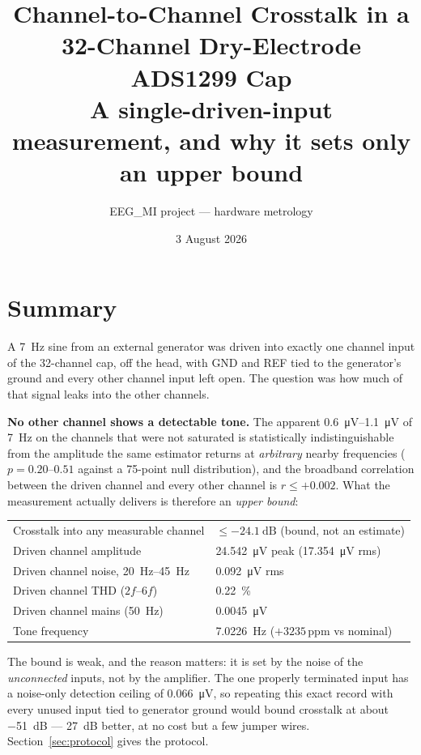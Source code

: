 \documentclass[11pt,a4paper]{article}
\title{\textbf{Channel-to-Channel Crosstalk in a 32-Channel Dry-Electrode\\ADS1299 Cap}\\[4pt]
\large A single-driven-input measurement, and why it sets only an upper bound}
\author{EEG\_MI project --- hardware metrology}
\date{3 August 2026}
\begin{document}
\maketitle

\section*{Summary}

A \SI{7}{\hertz} sine from an external generator was driven into exactly one channel input of
the 32-channel cap, off the head, with GND and REF tied to the generator's ground and every
other channel input left open. The question was how much of that signal leaks into the other
channels.

\textbf{No other channel shows a detectable tone.} The apparent \SIrange{0.6}{1.1}{\micro\volt}
of \SI{7}{\hertz} on the channels that were not saturated is statistically indistinguishable
from the amplitude the same estimator returns at \emph{arbitrary} nearby frequencies
($p=0.20$--$0.51$ against a 75-point null distribution), and the broadband correlation between
the driven channel and every other channel is $r \le +0.002$. What the measurement actually
delivers is therefore an \emph{upper bound}:

\begin{center}
\begin{tabular}{ll}
\toprule
Crosstalk into any measurable channel & $\le \SI{-24.1}{\deci\bel}$ (bound, not an estimate) \\
Driven channel amplitude & \SI{24.542}{\micro\volt} peak (\SI{17.354}{\micro\volt} rms) \\
Driven channel noise, \SIrange{20}{45}{\hertz} & \SI{0.092}{\micro\volt} rms \\
Driven channel THD ($2f$--$6f$) & \SI{0.22}{\percent} \\
Driven channel mains (\SI{50}{\hertz}) & \SI{0.0045}{\micro\volt} \\
Tone frequency & \SI{7.0226}{\hertz} ($+3235$\,ppm vs nominal) \\
\bottomrule
\end{tabular}
\end{center}

The bound is weak, and the reason matters: it is set by the noise of the \emph{unconnected}
inputs, not by the amplifier. The one properly terminated input has a noise-only detection
ceiling of \SI{0.066}{\micro\volt}, so repeating this exact record with every unused input tied
to generator ground would bound crosstalk at about \SI{-51}{\deci\bel} --- \SI{27}{\deci\bel}
better, at no cost but a few jumper wires. Section~\ref{sec:protocol} gives the protocol.
\end{document}
